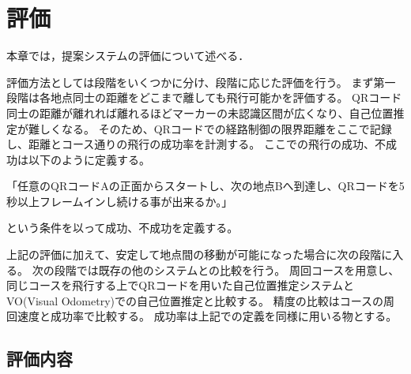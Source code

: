 \chapter{評価}
\label{evaluation}
本章では，提案システムの評価について述べる．

評価方法としては段階をいくつかに分け、段階に応じた評価を行う。
まず第一段階は各地点同士の距離をどこまで離しても飛行可能かを評価する。
QRコード同士の距離が離れれば離れるほどマーカーの未認識区間が広くなり、自己位置推定が難しくなる。
そのため、QRコードでの経路制御の限界距離をここで記録し、距離とコース通りの飛行の成功率を計測する。
ここでの飛行の成功、不成功は以下のように定義する。

「任意のQRコードAの正面からスタートし、次の地点Bへ到達し、QRコードを5秒以上フレームインし続ける事が出来るか。」

という条件を以って成功、不成功を定義する。

上記の評価に加えて、安定して地点間の移動が可能になった場合に次の段階に入る。
次の段階では既存の他のシステムとの比較を行う。
周回コースを用意し、同じコースを飛行する上でQRコードを用いた自己位置推定システムとVO(Visual Odometry)での自己位置推定と比較する。
精度の比較はコースの周回速度と成功率で比較する。
成功率は上記での定義を同様に用いる物とする。

\section{評価内容}



